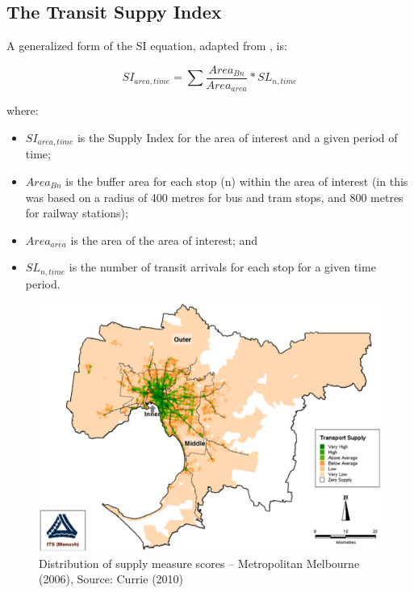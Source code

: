 \documentclass[preprint, 3p,
authoryear]{elsarticle} %
\begin{document}
\hypertarget{the-transit-suppy-index}{%
\subsection{The Transit Suppy Index}\label{the-transit-suppy-index}}

A generalized form of the SI equation, adapted from
\citet{currie2010identifying}, is:

\[SI_{area, time} = \sum{\frac{Area_{Bn}}{Area_{area}}*SL_{n, time}}\]

where:

\begin{itemize}
\item
  \(SI_{area, time}\) is the Supply Index for the area of interest and a
  given period of time;
\item
  \(Area_{Bn}\) is the buffer area for each stop (n) within the area of
  interest (in \citet{currie2010identifying} this was based on a radius
  of 400 metres for bus and tram stops, and 800 metres for railway
  stations);
\item
  \(Area_{area}\) is the area of the area of interest; and
\item
  \(SL_{n,time}\) is the number of transit arrivals for each stop for a
  given time period.
\end{itemize}

\begin{figure}
\includegraphics[width=1\linewidth]{graphics/Currie2010SI} \caption{Distribution of supply measure scores – Metropolitan Melbourne (2006), Source: Currie (2010)}\label{fig:Currie_map_SI}
\end{figure}
\end{document}
